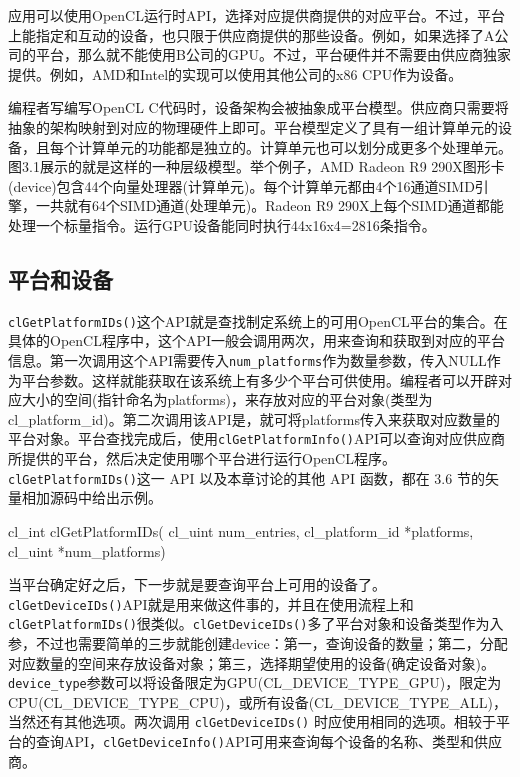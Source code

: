 应用可以使用OpenCL运行时API，选择对应提供商提供的对应平台。不过，平台上能指定和互动的设备，也只限于供应商提供的那些设备。例如，如果选择了A公司的平台，那么就不能使用B公司的GPU。不过，平台硬件并不需要由供应商独家提供。例如，AMD和Intel的实现可以使用其他公司的x86 CPU作为设备。

编程者写编写OpenCL C代码时，设备架构会被抽象成平台模型。供应商只需要将抽象的架构映射到对应的物理硬件上即可。平台模型定义了具有一组计算单元的设备，且每个计算单元的功能都是独立的。计算单元也可以划分成更多个处理单元。图3.1展示的就是这样的一种层级模型。举个例子，AMD Radeon R9 290X图形卡(device)包含44个向量处理器(计算单元)。每个计算单元都由4个16通道SIMD引擎，一共就有64个SIMD通道(处理单元)。Radeon R9 290X上每个SIMD通道都能处理一个标量指令。运行GPU设备能同时执行44x16x4=2816条指令。

\subsection{平台和设备}

\texttt{clGetPlatformIDs()}这个API就是查找制定系统上的可用OpenCL平台的集合。在具体的OpenCL程序中，这个API一般会调用两次，用来查询和获取到对应的平台信息。第一次调用这个API需要传入\texttt{num\_platforms}作为数量参数，传入NULL作为平台参数。这样就能获取在该系统上有多少个平台可供使用。编程者可以开辟对应大小的空间(指针命名为platforms)，来存放对应的平台对象(类型为 cl\_\allowbreak{}platform\_\allowbreak{}id)。第二次调用该API是，就可将platforms传入来获取对应数量的平台对象。平台查找完成后，使用\texttt{clGetPlatformInfo()}API可以查询对应供应商所提供的平台，然后决定使用哪个平台进行运行OpenCL程序。\texttt{clGetPlatformIDs()}这一 API 以及本章讨论的其他 API 函数，都在 3.6 节的矢量相加源码中给出示例。

\begin{codebox}[cpp]
cl_int
clGetPlatformIDs(
  cl_uint num_entries,
  cl_platform_id *platforms,
  cl_uint *num_platforms)
\end{codebox}

当平台确定好之后，下一步就是要查询平台上可用的设备了。\texttt{clGetDeviceIDs()}API就是用来做这件事的，并且在使用流程上和\texttt{clGetPlatformIDs()}很类似。\texttt{clGetDeviceIDs()}多了平台对象和设备类型作为入参，不过也需要简单的三步就能创建device：第一，查询设备的数量；第二，分配对应数量的空间来存放设备对象；第三，选择期望使用的设备(确定设备对象)。\texttt{device\_type}参数可以将设备限定为GPU(CL\_\allowbreak{}DEVICE\_\allowbreak{}TYPE\_\allowbreak{}GPU)，限定为CPU(CL\_\allowbreak{}DEVICE\_\allowbreak{}TYPE\_\allowbreak{}CPU)，或所有设备(CL\_\allowbreak{}DEVICE\_\allowbreak{}TYPE\_\allowbreak{}ALL)，当然还有其他选项。两次调用 \texttt{clGetDeviceIDs()} 时应使用相同的选项。相较于平台的查询API，\texttt{clGetDeviceInfo()}API可用来查询每个设备的名称、类型和供应商。


